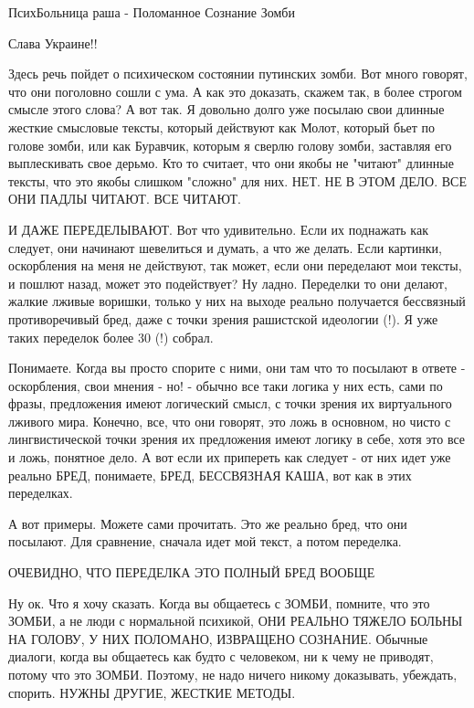  
 
 
 
 


ПсихБольница раша - Поломанное Сознание Зомби

Слава Украине!! 💛 💙 💛 💙 💛 💙 💛 💙        

Здесь речь пойдет о психическом состоянии путинских зомби. Вот много говорят,
что они поголовно сошли с ума. А как это доказать, скажем так, в более строгом
смысле этого слова? А вот так. Я довольно долго уже посылаю свои длинные
жесткие смысловые тексты, который действуют как Молот, который бьет по голове
зомби, или как Буравчик, которым я сверлю голову зомби, заставляя его
выплескивать свое дерьмо. Кто то считает, что они якобы не "читают" длинные
тексты, что это якобы слишком "сложно" для них.  НЕТ. НЕ В ЭТОМ ДЕЛО. ВСЕ ОНИ
ПАДЛЫ ЧИТАЮТ. ВСЕ ЧИТАЮТ.

И ДАЖЕ ПЕРЕДЕЛЫВАЮТ. Вот что удивительно. Если их поднажать как следует, они
начинают шевелиться и думать, а что же делать. Если картинки, оскорбления на
меня не действуют, так может, если они переделают мои тексты, и пошлют назад,
может это подействует? Ну ладно.  Переделки то они делают, жалкие лживые
воришки, только у них на выходе реально получается бессвязный противоречивый
бред, даже с точки зрения рашистской идеологии (!). Я уже таких переделок более
30 (!) собрал.

Понимаете. Когда вы просто спорите с ними, они там что то посылают в ответе -
оскорбления, свои мнения - но! - обычно все таки логика у них есть, сами по
фразы, предложения имеют логический смысл, с точки зрения их виртуального
лживого мира. Конечно, все, что они говорят, это ложь в основном, но чисто с
лингвистической точки зрения их предложения имеют логику в себе, хотя это все и
ложь, понятное дело. А вот если их припереть как следует - от них идет уже
реально БРЕД, понимаете, БРЕД, БЕССВЯЗНАЯ КАША, вот как в этих переделках.

А вот примеры. Можете сами прочитать. Это же реально бред, что они посылают.
Для сравнение, сначала идет мой текст, а потом переделка.


ОЧЕВИДНО, ЧТО ПЕРЕДЕЛКА ЭТО ПОЛНЫЙ БРЕД ВООБЩЕ

Ну ок. Что я хочу сказать. Когда вы общаетесь с ЗОМБИ, помните, что это ЗОМБИ,
а не люди с нормальной психикой, ОНИ РЕАЛЬНО ТЯЖЕЛО БОЛЬНЫ НА ГОЛОВУ, У НИХ
ПОЛОМАНО, ИЗВРАЩЕНО СОЗНАНИЕ. Обычные диалоги, когда вы общаетесь как будто с
человеком, ни к чему не приводят, потому что это ЗОМБИ. Поэтому, не надо ничего
никому доказывать, убеждать, спорить. НУЖНЫ ДРУГИЕ, ЖЕСТКИЕ МЕТОДЫ.

